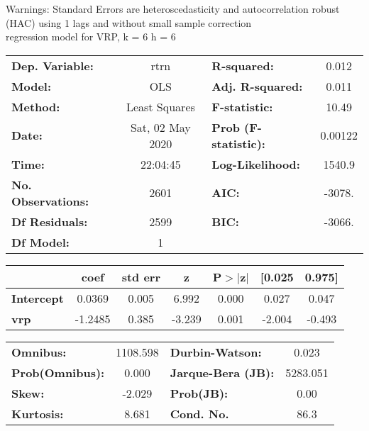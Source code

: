 Warnings: \newline
 [1] Standard Errors are heteroscedasticity and autocorrelation robust (HAC) using 1 lags and without small sample correction\\ 

regression model for VRP, k = 6 h = 6\begin{center}
\begin{tabular}{lclc}
\toprule
\textbf{Dep. Variable:}    &       rtrn       & \textbf{  R-squared:         } &     0.012   \\
\textbf{Model:}            &       OLS        & \textbf{  Adj. R-squared:    } &     0.011   \\
\textbf{Method:}           &  Least Squares   & \textbf{  F-statistic:       } &     10.49   \\
\textbf{Date:}             & Sat, 02 May 2020 & \textbf{  Prob (F-statistic):} &  0.00122    \\
\textbf{Time:}             &     22:04:45     & \textbf{  Log-Likelihood:    } &    1540.9   \\
\textbf{No. Observations:} &        2601      & \textbf{  AIC:               } &    -3078.   \\
\textbf{Df Residuals:}     &        2599      & \textbf{  BIC:               } &    -3066.   \\
\textbf{Df Model:}         &           1      & \textbf{                     } &             \\
\bottomrule
\end{tabular}
\begin{tabular}{lcccccc}
                   & \textbf{coef} & \textbf{std err} & \textbf{z} & \textbf{P$> |$z$|$} & \textbf{[0.025} & \textbf{0.975]}  \\
\midrule
\textbf{Intercept} &       0.0369  &        0.005     &     6.992  &         0.000        &        0.027    &        0.047     \\
\textbf{vrp}       &      -1.2485  &        0.385     &    -3.239  &         0.001        &       -2.004    &       -0.493     \\
\bottomrule
\end{tabular}
\begin{tabular}{lclc}
\textbf{Omnibus:}       & 1108.598 & \textbf{  Durbin-Watson:     } &    0.023  \\
\textbf{Prob(Omnibus):} &   0.000  & \textbf{  Jarque-Bera (JB):  } & 5283.051  \\
\textbf{Skew:}          &  -2.029  & \textbf{  Prob(JB):          } &     0.00  \\
\textbf{Kurtosis:}      &   8.681  & \textbf{  Cond. No.          } &     86.3  \\
\bottomrule
\end{tabular}
\end{center}

